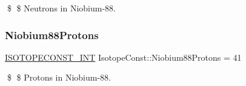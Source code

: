\$ \$ Neutrons in Niobium-\/88. \mbox{\label{group___isotope_const-_niobium-_nb88_gac637e8b93224c7bd17a77c908cecb907}} 
\subsubsection{\texorpdfstring{Niobium88\+Protons}{Niobium88Protons}}
{\footnotesize\ttfamily \mbox{\hyperlink{group___isotope_const-_macros_ga5f18360b3e99483a35c32d789e62621c}{I\+S\+O\+T\+O\+P\+E\+C\+O\+N\+S\+T\+\_\+\+I\+NT}} Isotope\+Const\+::\+Niobium88\+Protons = 41}

\$ \$ Protons in Niobium-\/88. 